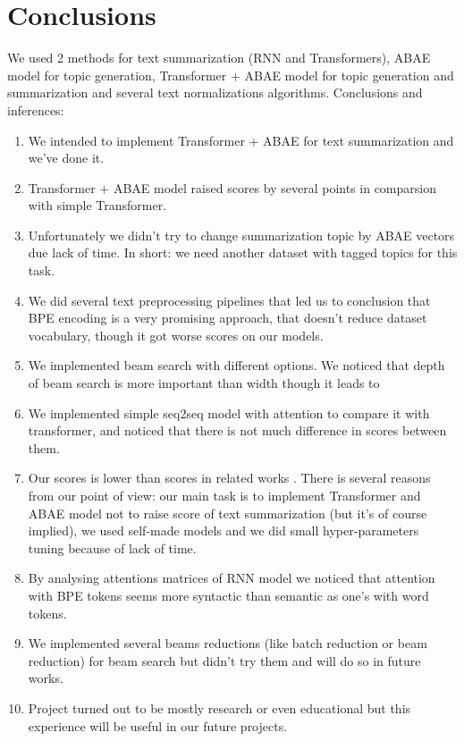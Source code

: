 \documentclass{article}
\begin{document}
\section{Conclusions}
We used 2 methods for text summarization (RNN and Transformers), ABAE model for topic generation, Transformer + ABAE model for topic generation and summarization and several text normalizations algorithms. 
Conclusions and inferences:
\begin{enumerate}
\item We intended to implement Transformer + ABAE for text summarization and we've done it.
\item Transformer + ABAE model raised scores by several points in comparsion with simple Transformer.
\item Unfortunately we didn't try to change summarization topic by ABAE vectors due lack of time. In short: we need another dataset with tagged topics for this task.
\item We did several text preprocessing pipelines that led us to conclusion that BPE encoding is a very promising approach, that doesn't reduce dataset vocabulary, though it got worse scores on our models.
\item We implemented beam search with different options. We noticed that depth of beam search is more important than width though it leads to 
\item We implemented simple seq2seq model with attention to compare it with transformer, and noticed that there is not much difference in scores between them.
\item Our scores is lower than scores in related works \cite{gavrilov2018self} \cite{gusev2019importance}. There is several reasons from our point of view: our main task is to implement Transformer and ABAE model not to raise score of text summarization (but it's of course implied), we used self-made models and we did small hyper-parameters tuning because of lack of time.
\item By analysing attentions matrices of RNN model we noticed that attention with BPE tokens seems more syntactic than semantic as one's with word tokens.
\item We implemented several beams reductions (like batch reduction or beam reduction) for beam search but didn't try them and will do so in future works.
\item Project turned out to be mostly research or even educational but this experience will be useful in our future projects.
\end{enumerate}

\pagebreak



\end{document}
